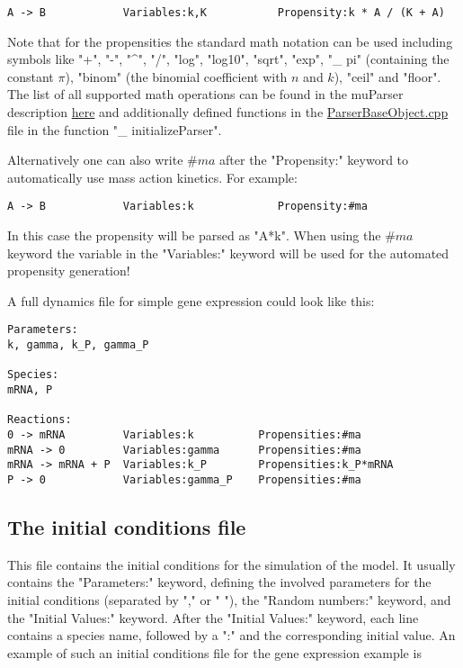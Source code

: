 \documentclass[11pt]{article} %
\begin{document}
\begin{enumerate}
\begin{tcolorbox}
\begin{verbatim}
A -> B	          Variables:k,K	          Propensity:k * A / (K + A)
\end{verbatim}
\end{tcolorbox}

Note that for the propensities the standard math notation can be used including symbols like "+", "-", "\textasciicircum", "/", "log", "log10", "sqrt", "exp", "\_ pi" (containing the constant $\pi$), "binom" (the binomial coefficient with $n$ and $k$), "ceil" and "floor". The list of all supported math operations can be found in the muParser description \href{https://beltoforion.de/article.php?a=muparser&p=features&s=idDef1#idDef1}{here} and additionally defined functions in the \href{https://github.com/Mijan/LFNS/blob/publishable/src/models/ParserBaseObject.cpp}{ParserBaseObject.cpp} file in the function "\_ initializeParser".

Alternatively one can also write $\#ma$ after the "Propensity:" keyword to automatically use mass action kinetics. For example:

\begin{tcolorbox}
\begin{verbatim}
A -> B	          Variables:k	          Propensity:#ma
\end{verbatim}
\end{tcolorbox}

In this case the propensity will be parsed as "A*k". When using the $\#ma$ keyword the variable in the "Variables:" keyword will be used for the automated propensity generation!

\end{enumerate}
A full dynamics file for simple gene expression could look like this: 

\begin{tcolorbox}
\begin{verbatim}
Parameters:
k, gamma, k_P, gamma_P

Species:
mRNA, P

Reactions:
0 -> mRNA         Variables:k          Propensities:#ma
mRNA -> 0         Variables:gamma      Propensities:#ma
mRNA -> mRNA + P  Variables:k_P	   	   Propensities:k_P*mRNA
P -> 0            Variables:gamma_P    Propensities:#ma
\end{verbatim}
\end{tcolorbox}

\subsection{The initial conditions file}
This file contains the initial conditions for the simulation of the model. It usually contains the "Parameters:" keyword, defining the involved parameters for the initial conditions (separated by "," or " "), the "Random numbers:" keyword, and the "Initial Values:" keyword. After the "Initial Values:" keyword, each line contains a species name, followed by a ":" and the corresponding initial value. An example of such an initial conditions file for the gene expression example is
\end{document}
